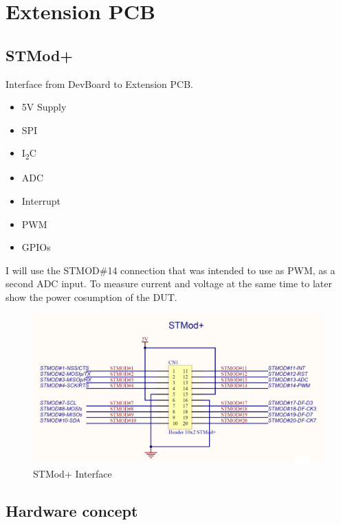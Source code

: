 \newpage


\section{Extension PCB}
\label{sec:Extension PCB}



\subsection{STMod+}
Interface from DevBoard to Extension PCB. 

\begin{itemize}
    \item 5V Supply
    \item SPI 
    \item I\textsubscript{2}C
    \item ADC
    \item Interrupt
    \item PWM
    \item GPIOs
\end{itemize}

I will use the STMOD\#14 connection that was intended to use as PWM, as a second ADC input. To measure current and voltage at the same time to later show the power cosumption of the DUT.

\begin{figure}[H]
	\centering
	\includegraphics[width=13cm]{Resources/STMOD_Interface.png}
	\caption{STMod+ Interface}
	\label{fig:STMod+ Interface}
\end{figure}




\newpage

\subsection{Hardware concept}

